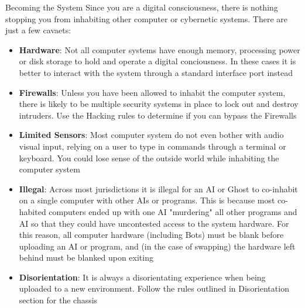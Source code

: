\begin{commentbox}{Becoming the System} 
Since you are a digital consciousness, there is nothing stopping you from inhabiting other computer or cybernetic systems. There are just a few cavaets:
  \begin{itemize}
    \item \textbf{Hardware}: Not all computer systems have enough memory, processing power or disk storage to hold and operate a digital conciousness. In these cases it is better to interact with the system through a standard interface port instead\\
    \item \textbf{Firewalls}: Unless you have been allowed to inhabit the computer system, there is likely to be multiple security systems in place to lock out and destroy intruders. Use the Hacking rules to determine if you can bypass the Firewalls\\
    \item \textbf{Limited Sensors}: Most computer system do not even bother with audio visual input, relying on a user to type in commands through a terminal or keyboard. You could lose sense of the outside world while inhabiting the computer system\\
    \item \textbf{Illegal}: Across most jurisdictions it is illegal for an AI or Ghost to co-inhabit on a single computer with other AIs or programs. This is because most co-habited computers ended up with one AI "murdering" all other programs and AI so that they could have uncontested access to the system hardware. For this reason, all computer hardware (including Bots) must be blank before uploading an AI or program, and (in the case of swapping) the hardware left behind must be blanked upon exiting\\
    \item \textbf{Disorientation}: It is always a disorientating experience when being uploaded to a new environment. Follow the rules outlined in Disorientation section for the chassis
  \end{itemize}
\end{commentbox}
